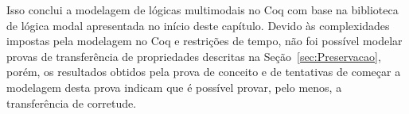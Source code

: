       Isso conclui a modelagem de lógicas multimodais no Coq com base na biblioteca de lógica modal apresentada no início deste capítulo. Devido às complexidades impostas
      pela modelagem no Coq e restrições de tempo, não foi possível modelar provas de transferência de propriedades descritas na Seção~\ref{sec:Preservacao}, porém, os resultados
      obtidos pela prova de conceito e de tentativas de começar a modelagem desta prova indicam que é possível provar, pelo menos, a transferência de corretude.




